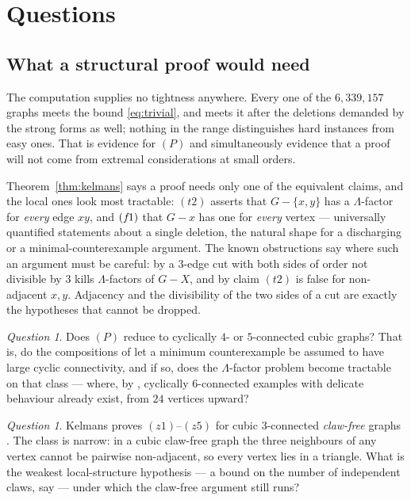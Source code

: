 \documentclass[11pt]{amsart}
\newcommand{\Lam}{\Lambda}
\theoremstyle{plain}
\theoremstyle{definition}
\theoremstyle{remark}
\newtheorem{question}[theorem]{Question}
\begin{document}
\section{Questions}\label{sec:questions}

\subsection{What a structural proof would need}\label{ssec:qproof}
The computation supplies no tightness anywhere. Every one of the
$6{,}339{,}157$ graphs meets the bound \eqref{eq:trivial}, and meets it
after the deletions demanded by the strong forms as well; nothing in the
range distinguishes hard instances from easy ones. That is evidence for
$(P)$ and simultaneously evidence that a proof will not come from
extremal considerations at small orders.

Theorem~\ref{thm:kelmans} says a proof needs only one of the equivalent
claims, and the local ones look most tractable: $(t2)$ asserts that
$G-\{x,y\}$ has a $\Lam$-factor for \emph{every} edge $xy$, and $(f\mkern-2mu1)$
that $G-x$ has one for \emph{every} vertex --- universally quantified
statements about a single deletion, the natural shape for a discharging
or a minimal-counterexample argument. The known obstructions say where
such an argument must be careful: by \cite[(r1)]{Kel11} a $3$-edge cut
with both sides of order not divisible by $3$ kills $\Lam$-factors of
$G-X$, and by \cite[(r4)]{Kel11} claim $(t2)$ is false for non-adjacent
$x,y$. Adjacency and the divisibility of the two sides of a cut are
exactly the hypotheses that cannot be dropped.

\begin{question}\label{q:cyclic}
Does $(P)$ reduce to cyclically $4$- or $5$-connected cubic graphs? That
is, do the compositions of \cite[\S2]{Kel11} let a minimum
counterexample be assumed to have large cyclic connectivity, and if so,
does the $\Lam$-factor problem become tractable on that class --- where,
by \cite[6.1]{Kel11}, cyclically $6$-connected examples with delicate
behaviour already exist, from $24$ vertices upward?
\end{question}

\begin{question}\label{q:clawfree}
Kelmans proves $(z1)$--$(z5)$ for cubic $3$-connected \emph{claw-free}
graphs \cite{Kel07b,Kel11b}. The class is narrow: in a cubic claw-free graph the
three neighbours of any vertex cannot be pairwise non-adjacent, so every
vertex lies in a triangle. What is the weakest local-structure hypothesis
--- a bound on the number of independent claws, say --- under which the
claw-free argument still runs?
\end{question}
\end{document}
